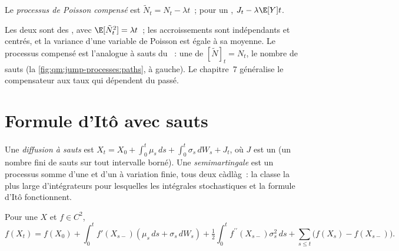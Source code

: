 \begin{definition}\label{def:qm:jump-processes:compensated}
Le \emph{processus de Poisson compensé} est $\tilde N_t = N_t - \lambda
t$~; pour un , $J_t - \lambda\E[Y]t$.
\end{definition}

Les deux sont des , avec $\E[\tilde N_t^2] = \lambda t$~; les accroissements sont indépendants et centrés,
et la variance d'une variable de Poisson est égale à sa moyenne. Le processus compensé est l'analogue à sauts
du ~: une  de  $[\tilde N]_t = N_t$, le nombre de sauts
(la \cref{fig:qm:jump-processes:paths}, à gauche). Le chapitre~7 généralise le compensateur aux taux qui
dépendent du passé.

\section{Formule d'Itô avec sauts}

\begin{definition}\label{def:qm:jump-processes:jd}
Une \emph{diffusion à sauts} est $X_t = X_0 + \int_0^t\mu_s\,ds + \int_0^t\sigma_s\,dW_s + J_t$,
où $J$ est un  (un nombre fini de sauts sur tout intervalle borné). Une
\emph{semimartingale} est un processus somme d'une  et d'un 
à variation finie, tous deux càdlàg~: la classe la plus large d'intégrateurs pour lesquelles les intégrales stochastiques
et la formule d'Itô fonctionnent.
\end{definition}

\begin{theorem}\label{thm:qm:jump-processes:ito}
Pour une  $X$ et $f \in C^2$,
\[
f(X_t) = f(X_0) + \int_0^tf'(X_{s-})(\mu_s\,ds + \sigma_s\,dW_s) + \tfrac12\int_0^tf^{\prime\prime}(X_{s-})\sigma_s^2\,ds +
\sum_{s \le t}\bigl(f(X_s) - f(X_{s-})\bigr).
\]
\end{theorem}

